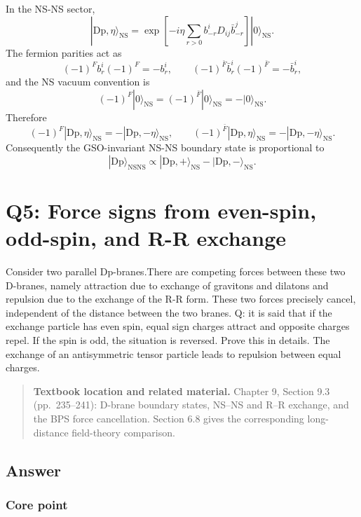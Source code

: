 \documentclass[
  10pt,
  a4paper,
  openany]{book}
\begin{document}
In the NS-NS sector, \[
|\mathrm{Dp},\eta\rangle_{\mathrm{NS}}
=
\exp\left[
-i\eta
\sum_{r>0}b^i_{-r}D_{ij}\bar b^j_{-r}
\right]
|0\rangle_{\mathrm{NS}}.
\] The fermion parities act as \[
(-1)^F b_r^i(-1)^F=-b_r^i,
\qquad
(-1)^{\bar F}\bar b_r^i(-1)^{\bar F}=-\bar b_r^i,
\] and the NS vacuum convention is \[
(-1)^F|0\rangle_{\mathrm{NS}}
=
(-1)^{\bar F}|0\rangle_{\mathrm{NS}}
=
-|0\rangle_{\mathrm{NS}}.
\] Therefore \[
\boxed{
(-1)^F|\mathrm{Dp},\eta\rangle_{\mathrm{NS}}
=
-|\mathrm{Dp},-\eta\rangle_{\mathrm{NS}},
\qquad
(-1)^{\bar F}|\mathrm{Dp},\eta\rangle_{\mathrm{NS}}
=
-|\mathrm{Dp},-\eta\rangle_{\mathrm{NS}}.
}
\] Consequently the GSO-invariant NS-NS boundary state is proportional
to \[
\boxed{
|\mathrm{Dp}\rangle_{\mathrm{NSNS}}
\propto
|\mathrm{Dp},+\rangle_{\mathrm{NS}}
-
|\mathrm{Dp},-\rangle_{\mathrm{NS}}.
}
\]

\section{Q5: Force signs from even-spin, odd-spin, and R-R
exchange}\label{q5-force-signs-from-even-spin-odd-spin-and-r-r-exchange}

Consider two parallel Dp-branes.There are competing forces between these
two D-branes, namely attraction due to exchange of gravitons and
dilatons and repulsion due to the exchange of the R-R form. These two
forces precisely cancel, independent of the distance between the two
branes. Q: it is said that if the exchange particle has even spin, equal
sign charges attract and opposite charges repel. If the spin is odd, the
situation is reversed. Prove this in details. The exchange of an
antisymmetric tensor particle leads to repulsion between equal charges.

\begin{quote}
\textbf{Textbook location and related material.} Chapter 9, Section 9.3
(pp.~235--241): D-brane boundary states, NS--NS and R--R exchange, and
the BPS force cancellation. Section 6.8 gives the corresponding
long-distance field-theory comparison.
\end{quote}

\subsection{Answer}\label{answer-8}

\subsubsection{Core point}\label{core-point-8}
\end{document}
